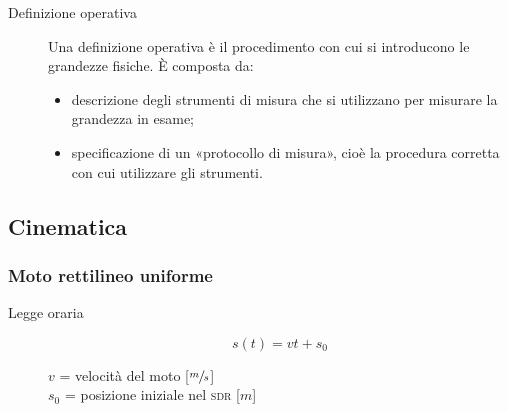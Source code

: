 \documentclass[a4paper,11pt,italian]{article}
\begin{document}
\begin{description}
  \item[Definizione operativa] 
  Una definizione operativa è il procedimento con cui si introducono le grandezze fisiche. È composta da:
  \begin{itemize}
    \item descrizione degli strumenti di misura che si utilizzano per misurare la grandezza in esame; 
    \item specificazione di un «protocollo di misura», cioè la procedura corretta con cui utilizzare gli strumenti.
  \end{itemize}
\end{description}



\subsection{Cinematica}\label{sec:cinematica}
\subsubsection{Moto rettilineo uniforme}
\begin{description}
  \item[Legge oraria] 
  \[ s(t) = v  t + s_0 \]
  \begin{multicols}{2}
  $ v $ = velocità del moto [$ \sfrac{m}{s} $]\\
  $ s_0 $ = posizione iniziale nel \textsc{sdr} [$ m $]
  \end{multicols}
\end{description}
\end{document}
